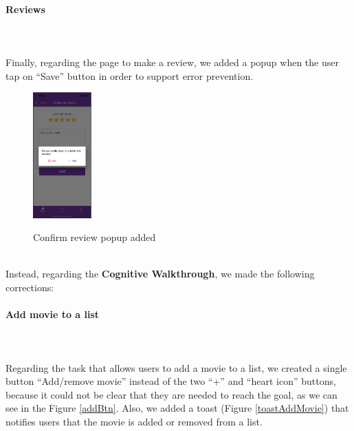 \documentclass[12pt, a4paper]{article}
\numberwithin{figure}{section}
\begin{document}
\paragraph{Reviews}\mbox{}\\\\
Finally, regarding the page to make a review, we added a popup when the user tap on “Save” button in
order to support error prevention.
\begin{figure}[H]
	\centering
	\includegraphics[width=0.2\textwidth]{images/prototype1/confirmReview.png}\\
	\caption{Confirm review popup added}
\end{figure}

\mbox{}\\
\noindent %
Instead, regarding the \textbf{Cognitive Walkthrough}, we made the following corrections:
\paragraph{Add movie to a list}
\mbox{}\\\\
Regarding the task that allows users to add a movie to a list, we created a single button “Add/remove movie”
instead of the two “+” and “heart icon” buttons, because it could not be clear that they are needed to reach the goal,
as we can see in the Figure \ref{addBtn}.
Also, we added a toast (Figure \ref{toastAddMovie}) that notifies users that the movie is added or removed from a list.
\end{document}
